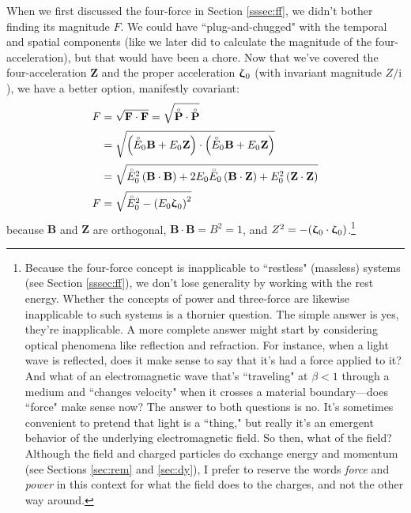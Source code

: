\documentclass[12pt]{article}
\renewcommand{\mathring}[1]{\accentset{\circ}{#1}}
\renewcommand{\vv}[1]{\mathbf{#1}}
\newcommand{\vvzeta}{\bm{\upzeta}}
\begin{document}
When we first discussed the four-force in Section \ref{sssec:ff}, we didn't bother finding its magnitude $F$. We could have ``plug-and-chugged" with the temporal and spatial components (like we later did to calculate the magnitude of the four-acceleration), but that would have been a chore. Now that we've covered the four-acceleration $\vv Z$ and the proper acceleration $\vvzeta_{\mkern1mu 0}$ (with invariant magnitude $Z/\mathrm{i}$), we have a better option, manifestly covariant:
\begin{equation}\label{eq:40}
\begin{split}
F &= \sqrt{\vv F \cdot \vv F} = \sqrt{\mathring{\vv P} \cdot \mathring{\vv P}} \\[2pt]
&= \sqrt{ \left( \mathring{E}_0 \mkern.5mu \vv B + E_0 \mkern.5mu \vv Z \right) \cdot \left( \mathring{E}_0 \mkern.5mu \vv B + E_0 \mkern.5mu \vv Z \right) }\\[2pt]
&= \sqrt{ \mathring{E}_0^2 \left( \vv B \cdot \vv B \right) + 2 E_0 \mathring{E}_0 \left( \vv B \cdot \vv Z \right) + E_0^2 \left( \vv Z \cdot \vv Z \right) } \\[2pt]
F &= \sqrt{ \mathring{E}_0^2 - \left( E_0 \vvzeta_{\mkern1mu 0} \right)^2 }
\end{split}
\end{equation}
because $\vv B$ and $\vv Z$ are orthogonal, $\vv B \cdot \vv B = B^2 = 1$, and $Z^2 = - (\vvzeta_{\mkern1mu 0} \cdot \vvzeta_{\mkern1mu 0})$.\footnote{Because the four-force concept is inapplicable to ``restless" (massless) systems (see Section \ref{sssec:ff}), we don't lose generality by working with the rest energy. Whether the concepts of power and three-force are likewise inapplicable to such systems is a thornier question. The simple answer is yes, they're inapplicable. A more complete answer might start by considering optical phenomena like reflection and refraction. For instance, when a light wave is reflected, does it make sense to say that it's had a force applied to it? And what of an electromagnetic wave that's ``traveling" at $\beta < 1$ through a medium and ``changes velocity" when it crosses a material boundary---does ``force" make sense now? The answer to both questions is no. It's sometimes convenient to pretend that light is a ``thing," but really it's an emergent behavior of the underlying electromagnetic field. So then, what of the field? Although the field and charged particles do exchange energy and momentum (see Sections \ref{sec:rem} and \ref{sec:dy}), I prefer to reserve the words \emph{force} and \emph{power} in this context for what the field does to the charges, and not the other way around.}
\end{document}
